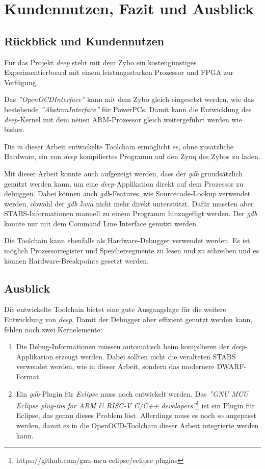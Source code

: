 \chapter{Kundennutzen, Fazit und Ausblick}
\section{Rückblick und Kundennutzen}
Für das Projekt \textit{deep} steht mit dem Zybo ein kostengünstiges Experimentierboard mit einem leistungsstarken Prozessor und FPGA zur Verfügung.

Das \textit{''OpenOCDInterface''} kann mit dem Zybo gleich eingesetzt werden, wie das bestehende \textit{''AbatronInterface''} für PowerPCs.
Damit kann die Entwicklung des \textit{deep}-Kernel mit dem neuen ARM-Prozessor gleich weitergeführt werden wie bisher.

Die in dieser Arbeit entwickelte Toolchain ermöglicht es, ohne zusätzliche Hardware, ein von \textit{deep} kompiliertes Programm auf den Zynq des Zybos zu laden.

Mit dieser Arbeit konnte auch aufgezeigt werden, dass der \textit{gdb} grundsätzlich genutzt werden kann, um eine \textit{deep}-Applikation direkt auf dem Prozessor zu debuggen.
Dabei können auch \textit{gdb}-Features, wie Sourcecode-Lookup verwendet werden, obwohl der \textit{gdb} Java nicht mehr direkt unterstützt.
Dafür mussten aber STABS-Informationen manuell zu einem Programm hinzugefügt werden.
Der \textit{gdb} konnte nur mit dem Command Line Interface genutzt werden.

Die Toolchain kann ebenfalls als Hardware-Debugger verwendet werden.
Es ist möglich Prozessorregister und Speichersegmente zu lesen und zu schreiben und es können Hardware-Breakpoints gesetzt werden.



\section{Ausblick}
Die entwickelte Toolchain bietet eine gute Ausgangslage für die weitere Entwicklung von \textit{deep}.
Damit der Debugger aber effizient genutzt werden kann, fehlen noch zwei Kernelemente:
\begin{enumerate}
	\item Die Debug-Informationen müssen automatisch beim kompilieren der \textit{deep}-Applikation erzeugt werden.
		  Dabei sollten nicht die veralteten STABS verwendet werden, wie in dieser Arbeit, sondern das modernere DWARF-Format.
	\item Ein \textit{gdb}-Plugin für \textit{Eclipse} muss noch entwickelt werden.
		  Das \textit{''GNU MCU Eclipse plug-ins for ARM \& RISC-V C/C++ developers''}\footnote{https://github.com/gnu-mcu-eclipse/eclipse-plugins} ist ein Plugin für Eclipse, das genau dieses Problem löst.
		  Allerdings muss es noch so angepasst werden, damit es in die OpenOCD-Toolchain dieser Arbeit integrierte werden kann.
\end{enumerate}



